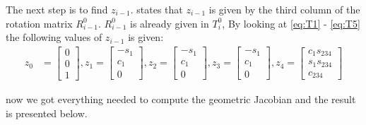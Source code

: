 The next step is to find $z_{i-1}$. \cite{Siciliano} states that $z_{i-1}$ is given by the third column of the rotation matrix $R_{i-1}^0$. $R_{i-1}^0$ is already given in $T_i^0$, By looking at \eqref{eq:T1} - \eqref{eq:T5} the following values of $z_{i-1}$ is given:
\begin{align*}
    z_0 &= \begin{bmatrix}0\\0\\1\end{bmatrix},
    z_1 = \begin{bmatrix}-s_1\\c_1\\0\end{bmatrix},
    z_2 = \begin{bmatrix}-s_1\\c_1\\0\end{bmatrix},
    z_3 = \begin{bmatrix}-s_1\\c_1\\0\end{bmatrix},
    z_4 = \begin{bmatrix}c_1s_{234}\\s_1s_{234}\\c_{234}\end{bmatrix}
\end{align*}

now we got everything needed to compute the geometric Jacobian and the result is presented below.


